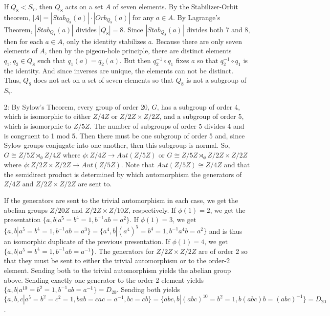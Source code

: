 \documentclass[12pt]{article}
\begin{document}
If $Q_8<S_7$, then $Q_8$ acts on a set $A$ of seven elements. By the Stabilizer-Orbit theorem, $|A|=|Stab_{Q_8}(a)| \cdot |Orb_{Q_8}(a)|$ for any $a \in A$. By Lagrange's Theorem, $|Stab_{Q_8}(a)|$ divides $|Q_8|=8$. Since $|Stab_{Q_8}(a)|$ divides both 7 and 8, then for each $a \in A$, only the identity stabilizes $a$. Because there are only seven elements of $A$, then by the pigeon-hole principle, there are distinct elements $q_1,q_2 \in Q_8$ such that $q_1(a)=q_2(a)$. But then $q_2^{-1} \circ q_1$ fixes $a$ so that $q_2^{-1} \circ q_1$ is the identity. And since inverses are unique, the elements can not be distinct. Thus, $Q_8$ does not act on a set of seven elements so that $Q_8$ is not a subgroup of $S_7$. \newline

2: By Sylow's Theorem, every group of order 20, $G$, has a subgroup of order 4, which is isomorphic to either $Z/4Z$ or $Z/2Z \times Z/2Z$, and a subgroup of order 5, which is isomorphic to $Z/5Z$. The number of subgroups of order 5 divides 4 and is congruent to 1 mod 5. Then there must be one subgroup of order 5 and, since Sylow groups conjugate into one another, then this subgroup is normal. So, $G \cong Z/5Z \rtimes_\phi Z/4Z$ where $\phi:Z/4Z \rightarrow Aut(Z/5Z)$ or $G \cong Z/5Z \rtimes_\phi Z/2Z \times Z/2Z$ where $\phi:Z/2Z \times Z/2Z \rightarrow Aut(Z/5Z)$. Note that $Aut(Z/5Z) \cong Z/4Z$ and that the semidirect product is determined by which automorphism the generators of $Z/4Z$ and $Z/2Z \times Z/2Z$ are sent to. \newline

If the generators are sent to the trivial automorphism in each case, we get the abelian groups $Z/20Z$ and $Z/2Z \times Z/10Z$, respectively. If $\phi(1)=2$, we get the presentation $\{ a,b|a^5=b^4=1,b^{-1}ab=a^2 \}$. If $\phi(1)=3$, we get $\{ a,b | a^5=b^4=1, b^{-1}ab=a^3 \} = \{ a^4,b | (a^4)^5=b^4=1,b^{-1}a^4b=a^2 \}$ and is thus an isomorphic duplicate of the previous presentation. If $\phi(1)=4$, we get $\{ a,b | a^5=b^4=1,b^{-1}ab=a^{-1} \}$. The generators for $Z/2Z \times Z/2Z$ are of order 2 so that they must be sent to either the trivial automorphism or to the order-2 element. Sending both to the trivial automorphism yields the abelian group above. Sending exactly one generator to the order-2 element yields $\{a,b | a^{10}=b^2=1,b^{-1}ab=a^{-1} \}=D_{20}$. Sending both yields $\{a,b,c | a^5=b^2=c^2=1, bab=cac=a^{-1},bc=cb \} = \{abc,b | (abc)^{10}=b^2=1,b(abc)b=(abc)^{-1} \} = D_{20}$. \newline
\end{document}
